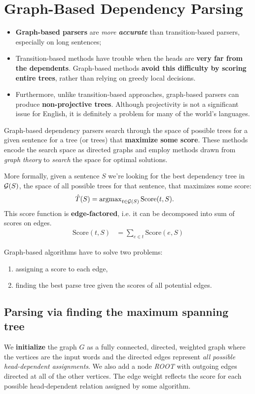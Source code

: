 \documentclass[11pt]{article}
\begin{document}
\section{Graph-Based Dependency Parsing}
\begin{itemize}
\item \textbf{Graph-based parsers} are \emph{more \textbf{accurate}} than transition-based parsers, especially on long sentences;
\item Transition-based methods have trouble when the heads are \textbf{very far from the dependents}. Graph-based methods \textbf{avoid this difficulty by scoring entire trees}, rather than relying on greedy local decisions.

\item Furthermore, unlike transition-based approaches, graph-based parsers can produce \textbf{non-projective trees}. Although projectivity is not a significant issue for English, it is definitely a problem for many of the world’s languages.
\end{itemize}
  

Graph-based dependency parsers search through the space of possible trees for a given sentence for a tree (or trees) that \textbf{maximize some score}. These methods encode the search space as directed graphs and employ methods drawn from \emph{graph theory} to \emph{search} the space for optimal solutions. 

More formally, given a sentence $S$ we’re looking for the best dependency tree in ${\mathcal G}(S)$, the space of all possible trees for that sentence, that maximizes some score:
\begin{align*}
\hat{T}(S) &= \operatorname{argmax}_{t \in {\mathcal G}(S)}\text{Score}(t, S).
\end{align*} This score function is \textbf{edge-factored}, i.e. it can be decomposed into sum of scores on edges. 
\begin{align*}
\text{Score}(t, S) &= \sum_{e \in t}\text{Score}(e, S)
\end{align*}

Graph-based algorithms have to solve two problems:
\begin{enumerate}
\item assigning a score to each edge, 
\item finding the best parse tree given the scores of all potential edges.
\end{enumerate}

\subsection{Parsing via finding the maximum spanning tree}
We \textbf{initialize} the graph $G$ as a fully connected, directed, weighted graph where the vertices are the input words and the directed edges represent \emph{all possible head-dependent assignments}. We also add a node \emph{ROOT} with outgoing edges directed at all of the other vertices. The edge weight reflects the score for each possible head-dependent relation assigned by some algorithm.
\end{document}
